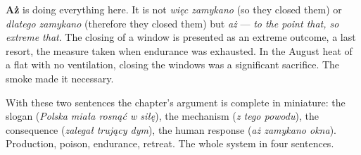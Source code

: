 \textbf{Aż} is doing everything here. It is not
\textit{więc zamykano} (so they closed them) or
\textit{dlatego zamykano} (therefore they closed
them) but \textit{aż} --- \textit{to the point
that, so extreme that}. The closing of a window
is presented as an extreme outcome, a last resort,
the measure taken when endurance was exhausted.
In the August heat of a flat with no ventilation,
closing the windows was a significant sacrifice.
The smoke made it necessary.

\medskip
With these two sentences the chapter's argument
is complete in miniature: the slogan
(\textit{Polska miała rosnąć w siłę}), the
mechanism (\textit{z tego powodu}), the
consequence (\textit{zalegał trujący dym}), the
human response (\textit{aż zamykano okna}).
Production, poison, endurance, retreat. The
whole system in four sentences.
